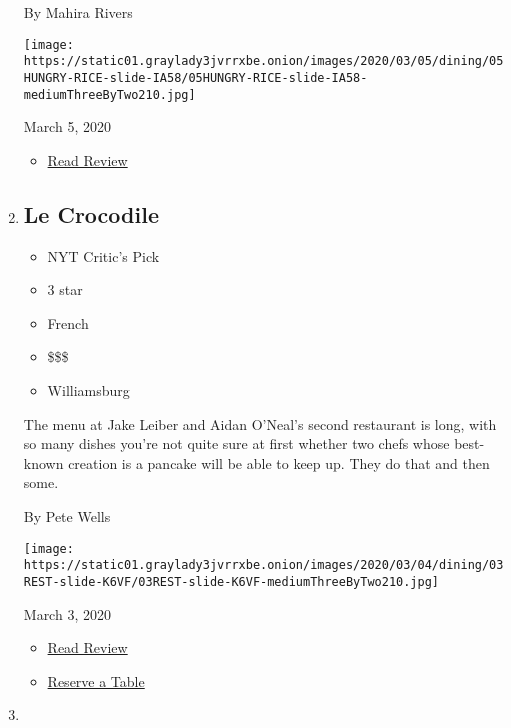 \begin{enumerate}
  By Mahira Rivers

  \texttt{[image: https://static01.graylady3jvrrxbe.onion/images/2020/03/05/dining/05HUNGRY-RICE-slide-IA58/05HUNGRY-RICE-slide-IA58-mediumThreeByTwo210.jpg]}

  March 5, 2020

  \begin{itemize}
  \tightlist
  \item
    \href{https://www.nytimes3xbfgragh.onion/2020/03/05/dining/rice-and-miso-review-onigiri.html?rref=collection\%2Fcollection\%2Frestaurant-guide}{Read
    Review}
  \end{itemize}
\item
  \href{https://www.nytimes3xbfgragh.onion/2020/03/03/dining/le-crocodile-review-pete-wells.html}{}

  \hypertarget{le-crocodile}{%
  \subsection{Le Crocodile}\label{le-crocodile}}

  \begin{itemize}
  \tightlist
  \item
    NYT Critic's Pick
  \item
     3 star
  \item
    French
  \item
    \$\$\$
  \item
    Williamsburg
  \end{itemize}

  The menu at Jake Leiber and Aidan O'Neal's second restaurant is long,
  with so many dishes you're not quite sure at first whether two chefs
  whose best-known creation is a pancake will be able to keep up. They
  do that and then some.

  By Pete Wells

  \texttt{[image: https://static01.graylady3jvrrxbe.onion/images/2020/03/04/dining/03REST-slide-K6VF/03REST-slide-K6VF-mediumThreeByTwo210.jpg]}

  March 3, 2020

  \begin{itemize}
  \tightlist
  \item
    \href{https://www.nytimes3xbfgragh.onion/2020/03/03/dining/le-crocodile-review-pete-wells.html?rref=collection\%2Fcollection\%2Frestaurant-guide}{Read
    Review}
  \item
    \href{https://resy.com/cities/ny/le-crocodile?utm_source=nyt\&utm_medium=restoprofile\&utm_campaign=affiliates\&aff_id=c1fe784}{Reserve
    a Table}
  \end{itemize}
\item
  \href{https://www.nytimes3xbfgragh.onion/2020/02/28/dining/hamido-seafood-astoria.html}{}


\end{enumerate}
